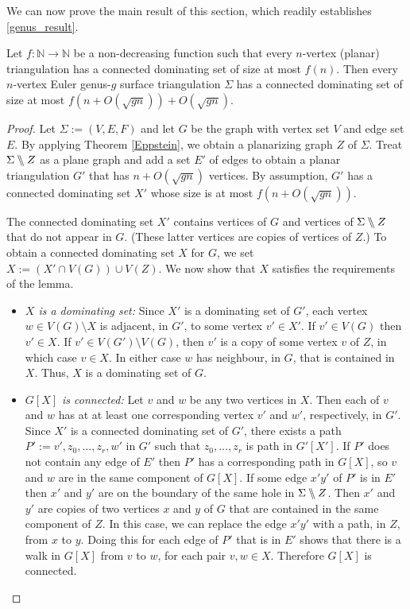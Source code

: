 We can now prove the main result of this section, which readily establishes \cref{genus_result}.

\begin{lem}\label{generic_surface_thm}
    Let $f:\mathbb{N} \longrightarrow \mathbb{N}$ be a non-decreasing function such that every $n$-vertex (planar) triangulation has a connected dominating set of size at most $f(n)$. Then every $n$-vertex Euler genus-$g$ surface triangulation $\Sigma$ has a connected dominating set of size at most $f(n + O(\sqrt{gn})) + O(\sqrt{gn})$.
\end{lem}

\begin{proof}
Let $\Sigma:=(V,E,F)$ and let $G$ be the graph with vertex set $V$ and edge set $E$.
By applying Theorem \ref{Eppstein}, we obtain a planarizing graph
$Z$ of $\Sigma$. Treat $\Sigma \bbslash Z$ as a plane graph and add a set $E'$ of edges to obtain a planar triangulation $G'$ that has $n+O(\sqrt{gn})$ vertices. By assumption, $G'$ has a connected dominating set $X'$ whose size is at most $f(n + O(\sqrt{gn}))$.

The connected dominating set $X'$ contains vertices of $G$ and vertices of $\Sigma\bbslash Z$ that do not appear in $G$.  (These latter vertices are copies of vertices of $Z$.) To obtain a connected dominating set $X$ for $G$, we set $X:=(X'\cap V(G))\cup V(Z)$.   We now show that $X$ satisfies the requirements of the lemma.
\begin{itemize}
    \item \emph{$X$ is a dominating set:} Since $X'$ is a dominating set of $G'$, each vertex $w\in V(G)\setminus X$ is adjacent, in $G'$, to some vertex $v'\in X'$.  If $v'\in V(G)$ then $v'\in X$.  If $v'\in V(G')\setminus V(G)$, then $v'$ is a copy of some vertex $v$ of $Z$, in which case $v\in X$. In either case $w$ has neighbour, in $G$, that is contained in $X$.  Thus, $X$ is a dominating set of $G$.

    \item \emph{$G[X]$ is connected:} Let $v$ and $w$ be any two vertices in $X$. Then each of $v$ and $w$ has at at least one corresponding vertex $v'$ and $w'$, respectively, in $G'$.   Since $X'$ is a connected dominating set of $G'$, there exists a path $P':=v',z_0,\ldots,z_r,w'$ in $G'$ such that $z_0,\ldots,z_r$ is path in $G'[X']$.  If $P'$ does not contain any edge of $E'$ then $P'$ has a corresponding path in $G[X]$, so $v$ and $w$ are in the same component of $G[X]$.  If some edge $x'y'$ of $P'$ is in $E'$ then $x'$ and $y'$ are on the boundary of the same hole in $\Sigma\bbslash Z$.  Then $x'$ and $y'$ are copies of two vertices $x$ and $y$ of $G$ that are contained in the same component of $Z$.  In this case, we can replace the edge $x'y'$ with a path, in $Z$, from $x$ to $y$.  Doing this for each edge of $P'$ that is in $E'$ shows that there is a walk in $G[X]$ from $v$ to $w$, for each pair $v,w\in X$. Therefore $G[X]$ is connected.
    

\end{itemize}
\end{proof}
